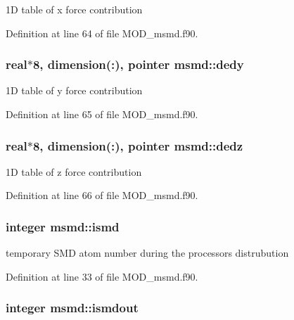 1\-D table of x force contribution 



Definition at line 64 of file M\-O\-D\-\_\-msmd.\-f90.

\hypertarget{classmsmd_a7926ca2df6f47e20454581e3b619f8d3}{
\subsubsection[{dedy}]{\setlength{\rightskip}{0pt plus 5cm}real$\ast$8, dimension(\-:), pointer msmd\-::dedy}}\label{classmsmd_a7926ca2df6f47e20454581e3b619f8d3}


1\-D table of y force contribution 



Definition at line 65 of file M\-O\-D\-\_\-msmd.\-f90.

\hypertarget{classmsmd_a20266d06c8fd7a1b7ded88962bc59339}{
\subsubsection[{dedz}]{\setlength{\rightskip}{0pt plus 5cm}real$\ast$8, dimension(\-:), pointer msmd\-::dedz}}\label{classmsmd_a20266d06c8fd7a1b7ded88962bc59339}


1\-D table of z force contribution 



Definition at line 66 of file M\-O\-D\-\_\-msmd.\-f90.

\hypertarget{classmsmd_ac6ff7790f7826383a90213add5efe1ff}{
\subsubsection[{ismd}]{\setlength{\rightskip}{0pt plus 5cm}integer msmd\-::ismd}}\label{classmsmd_ac6ff7790f7826383a90213add5efe1ff}


temporary S\-M\-D atom number during the processors distrubution 



Definition at line 33 of file M\-O\-D\-\_\-msmd.\-f90.

\hypertarget{classmsmd_a3d7ff9b73382ccebdf42c0c5a01e673c}{
\subsubsection[{ismdout}]{\setlength{\rightskip}{0pt plus 5cm}integer msmd\-::ismdout}}\label{classmsmd_a3d7ff9b73382ccebdf42c0c5a01e673c}


